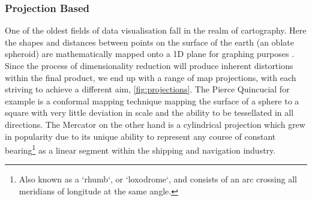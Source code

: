 \subsubsection{Projection Based}\label{sec:merc}
One of the oldest fields of data visualisation fall in the realm of cartography. Here the shapes and distances between points on the surface of the earth (an oblate spheroid) are mathematically mapped onto a 1D plane for graphing purposes \cite{projections}. Since the process of dimensionality reduction will produce inherent distortions within the final product, we end up with a range of map projections, with each striving to achieve a different aim, \autoref{fig:projections}. The Pierce Quincucial for example is a conformal mapping technique mapping the surface of a sphere to a square with very little deviation in scale and the ability to be tessellated in all directions. The Mercator  on the other hand is a cylindrical projection which grew in popularity due to its unique ability to represent any course of constant bearing\footnote{Also known as a `rhumb`, or `loxodrome`, and consists of an arc crossing all meridians of longitude at the same angle.} as a linear segment within the shipping and navigation industry. 

